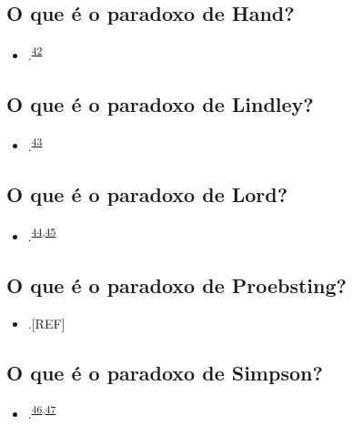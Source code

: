 \documentclass[
  a4paper,
]{book}
\providecommand{\tightlist}{%
  \setlength{\itemsep}{0pt}\setlength{\parskip}{0pt}}
\begin{document}
\hypertarget{hand}{%
\subsection{O que é o paradoxo de Hand?}\label{hand}}

\begin{itemize}
\tightlist
\item
  .\textsuperscript{\protect\hyperlink{ref-hand1992}{42}}
\end{itemize}

\hypertarget{lindley}{%
\subsection{O que é o paradoxo de Lindley?}\label{lindley}}

\begin{itemize}
\tightlist
\item
  .\textsuperscript{\protect\hyperlink{ref-lindley1957}{43}}
\end{itemize}

\hypertarget{lord}{%
\subsection{O que é o paradoxo de Lord?}\label{lord}}

\begin{itemize}
\tightlist
\item
  .\textsuperscript{\protect\hyperlink{ref-lord1967}{44},\protect\hyperlink{ref-lord1969}{45}}
\end{itemize}

\hypertarget{proebsting}{%
\subsection{O que é o paradoxo de Proebsting?}\label{proebsting}}

\begin{itemize}
\tightlist
\item
  .{[}REF{]}
\end{itemize}

\hypertarget{simpson}{%
\subsection{O que é o paradoxo de Simpson?}\label{simpson}}

\begin{itemize}
\tightlist
\item
  .\textsuperscript{\protect\hyperlink{ref-simpson1951}{46},\protect\hyperlink{ref-blyth1972}{47}}
\end{itemize}
\end{document}
